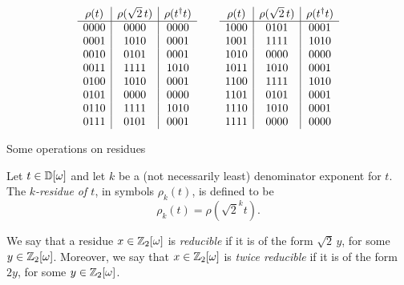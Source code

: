 \begin{table}
  \[ \begin{array}{c|c|c} \rho(t) & \rho(\sqrt{2}\,t) & \rho(t^{\dagger} t)\\\hline
    0000 & 0000 & 0000 \\
    0001 & 1010 & 0001 \\
    0010 & 0101 & 0001 \\
    0011 & 1111 & 1010 \\

    0100 & 1010 & 0001 \\
    0101 & 0000 & 0000 \\
    0110 & 1111 & 1010 \\
    0111 & 0101 & 0001 \\
  \end{array}\qquad
  \begin{array}{c|c|c} \rho(t) & \rho(\sqrt{2}\,t) & \rho(t^{\dagger} t)\\\hline
    1000 & 0101 & 0001 \\
    1001 & 1111 & 1010 \\
    1010 & 0000 & 0000 \\
    1011 & 1010 & 0001 \\

    1100 & 1111 & 1010 \\
    1101 & 0101 & 0001 \\
    1110 & 1010 & 0001 \\
    1111 & 0000 & 0000 \\
  \end{array}
  \]
  \caption{Some operations on residues}\label{tab-residue}
\end{table}

\begin{definition}[$k$-Residue]
  Let $t\in\mathbb{D}[\omega]$ and let $k$ be a (not necessarily least) denominator exponent for $t$. The {\em
  $k$-residue of $t$}, in symbols $\rho_k(t)$, is defined to be
  \[ 
    \rho_k(t) = \rho(\sqrt{2}^k t).
  \]
\end{definition}

\begin{definition}[Reducibility]
  We say that a residue $x\in\mathbb{Z}_2[\omega]$ is {\em reducible} if it is of the form $\sqrt{2}\,y$, for some
  $y\in\mathbb{Z}_2[\omega]$. Moreover, we say that $x\in\mathbb{Z}_2[\omega]$ is {\em twice reducible} if it is of the form $2y$,
  for some $y\in\mathbb{Z}_2[\omega]$.
\end{definition}

